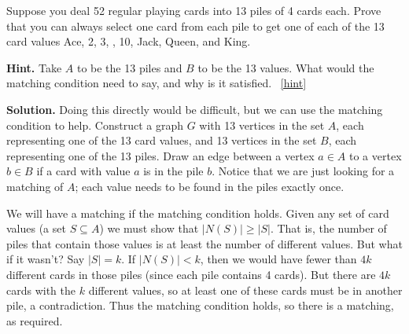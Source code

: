 \documentclass{book}
\begin{document}
\setcounter{project}{61}
\addtocounter{project}{-1}
\begin{activity}[]\label{activity-54}
\hypertarget{p-486}{}%
Suppose you deal 52 regular playing cards into 13 piles of 4 cards each. Prove that you can always select one card from each pile to get one of each of the 13 card values Ace, 2, 3, \textellipsis{}, 10, Jack, Queen, and King.%
\par\smallskip%
\noindent\textbf{Hint.}\hypertarget{hint-25}{}\quad%
\hypertarget{p-487}{}%
Take \(A\) to be the 13 piles and \(B\) to be the 13 values.  What would the matching condition need to say, and why is it satisfied.%
~\hfill{\tiny\hyperlink{a-61}{[hint]}\hypertarget{q-61}{}}\par\smallskip%
\noindent\textbf{Solution.}\hypertarget{solution-53}{}\quad%
\hypertarget{p-488}{}%
Doing this directly would be difficult, but we can use the matching condition to help. Construct a graph \(G\) with 13 vertices in the set \(A\), each representing one of the 13 card values, and 13 vertices in the set \(B\), each representing one of the 13 piles. Draw an edge between a vertex \(a \in A\) to a vertex \(b \in B\) if a card with value \(a\) is in the pile \(b\). Notice that we are just looking for a matching of \(A\); each value needs to be found in the piles exactly once.%
\par
\hypertarget{p-489}{}%
We will have a matching if the matching condition holds. Given any set of card values (a set \(S \subseteq A\)) we must show that \(|N(S)| \ge |S|\). That is, the number of piles that contain those values is at least the number of different values. But what if it wasn't? Say \(|S| = k\). If \(|N(S)| \lt  k\), then we would have fewer than \(4k\) different cards in those piles (since each pile contains 4 cards). But there are \(4k\) cards with the \(k\) different values, so at least one of these cards must be in another pile, a contradiction. Thus the matching condition holds, so there is a matching, as required.%
\end{activity}
\end{document}
